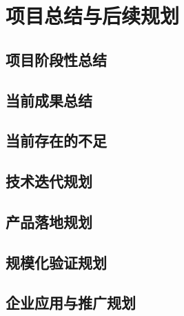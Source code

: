 \chapter{项目总结与后续规划}
\label{chap:conclusion}

\section{项目阶段性总结}

\section{当前成果总结}

\section{当前存在的不足}

\section{技术迭代规划}

\section{产品落地规划}

\section{规模化验证规划}

\section{企业应用与推广规划}
